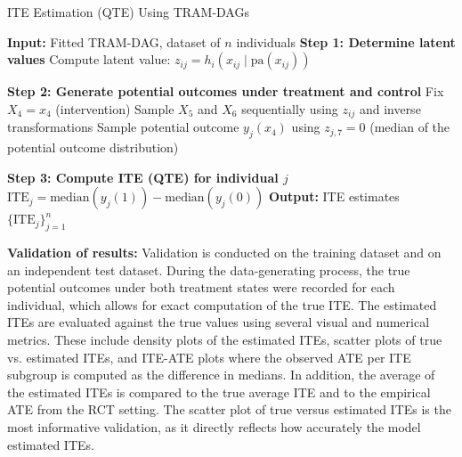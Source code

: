 \begin{algorithm}
\caption{ITE Estimation (QTE) Using TRAM-DAGs}
\label{alg:ite_qte}
\begin{algorithmic}
\State \textbf{Input:} Fitted TRAM-DAG, dataset of $n$ individuals
  \State \textbf{Step 1: Determine latent values}
    \State Compute latent value: $z_{ij} = h_i(x_{ij} \mid \text{pa}(x_{ij}))$
  \EndFor

  \State \textbf{Step 2: Generate potential outcomes under treatment and control}
   
    \State Fix $X_4 = x_4$ (intervention)
    \State Sample $X_5$ and $X_6$ sequentially using $z_{ij}$ and inverse transformations
    \State Sample potential outcome $y_j(x_4)$ using $z_{j,7} = 0$ (median of the potential outcome distribution)

  \EndFor

  \State \textbf{Step 3: Compute ITE (QTE) for individual $j$}
  \State $\text{ITE}_j = \text{median}(y_j(1)) - \text{median}(y_j(0))$
\EndFor
\State \textbf{Output:} ITE estimates $\{\text{ITE}_j\}_{j=1}^n$
\end{algorithmic}
\end{algorithm}


\vspace{5mm} %

\textbf{Validation of results:} Validation is conducted on the training dataset and on an independent test dataset. During the data-generating process, the true potential outcomes under both treatment states were recorded for each individual, which allows for exact computation of the true ITE. The estimated ITEs are evaluated against the true values using several visual and numerical metrics. These include density plots of the estimated ITEs, scatter plots of true vs. estimated ITEs, and ITE-ATE plots where the observed ATE per ITE subgroup is computed as the difference in medians. In addition, the average of the estimated ITEs is compared to the true average ITE and to the empirical ATE from the RCT setting. The scatter plot of true versus estimated ITEs is the most informative validation, as it directly reflects how accurately the model estimated ITEs.














